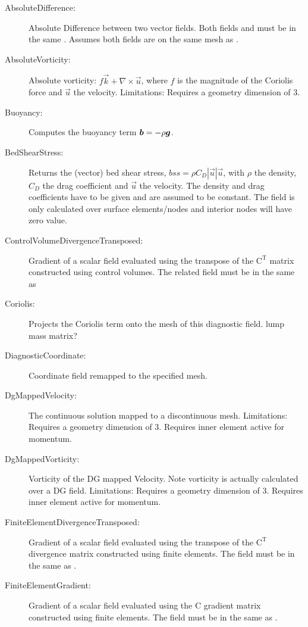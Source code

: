 \begin{description}
 \item[AbsoluteDifference:]Absolute Difference between two vector fields. Both fields and  must be in the same . Assumes both fields are on the same mesh as .
 \item[AbsoluteVorticity:]Absolute vorticity:  $f\vec{k} + \nabla \times \vec{u}$, where $f$ is the magnitude of the Coriolis force and $\vec{u}$ the velocity.
	Limitations: Requires a geometry dimension of 3.
 \item[Buoyancy:]Computes the buoyancy term ${\mbox{\boldmath$b$}}=-\rho{\mbox{\boldmath$g$}}$.
 \item[BedShearStress:]Returns the (vector) bed shear stress, $bss = \rho C_D|\vec{u}|\vec{u}$, with $\rho$ the density, $C_D$ the drag coefficient and $\vec{u}$ the velocity. The density and drag coefficients have to be given and are assumed to be constant. The field is only calculated over surface elements/nodes and interior nodes will have zero value.
 \item[ControlVolumeDivergenceTransposed:]Gradient of a scalar field evaluated using the transpose of the $\mathrm{C}^\mathrm{T}$ matrix constructed using control volumes. The related field must be in the same  as 
 \item[Coriolis:]Projects the Coriolis term onto the mesh of this diagnostic field. lump mass matrix?
 \item[DiagnosticCoordinate:]Coordinate field remapped to the specified mesh.
 \item[DgMappedVelocity:]The continuous solution mapped to a discontinuous mesh.
  Limitations: Requires a geometry dimension of 3. Requires inner element active for momentum.
 \item[DgMappedVorticity:]Vorticity of the DG mapped Velocity. Note vorticity is actually calculated over a DG field.
  Limitations: Requires a geometry dimension of 3. Requires inner element active for momentum.
 \item[FiniteElementDivergenceTransposed:]Gradient of a scalar field evaluated using the transpose of the $\mathrm{C}^\mathrm{T}$ divergence matrix constructed using finite elements. The field must be in the same  as .
 \item[FiniteElementGradient:]Gradient of a scalar field evaluated using the C gradient matrix constructed using finite elements. The field must be in the same  as .

\end{description}
